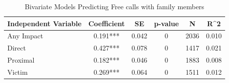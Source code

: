 \begin{table}

\caption{\label{tab:tab:q25_3_rev_bivariate}Bivariate Models Predicting Free calls with family members}
\centering
\begin{tabular}[t]{lccccc}
\toprule
Independent Variable & Coefficient & SE & p-value & N & R\textasciicircum{}2\\
\midrule
Any Impact & 0.191*** & 0.042 & 0 & 2036 & 0.010\\
Direct & 0.427*** & 0.078 & 0 & 1417 & 0.021\\
Proximal & 0.182*** & 0.046 & 0 & 1883 & 0.008\\
Victim & 0.269*** & 0.064 & 0 & 1511 & 0.012\\
\bottomrule
\end{tabular}
\end{table}
